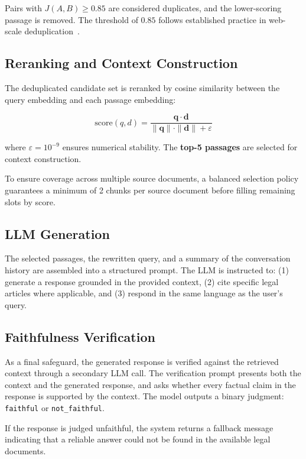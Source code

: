 \documentclass[12pt, a4paper]{article}
\begin{document}
Pairs with $J(A,B) \geq 0.85$ are considered duplicates, and the lower-scoring
passage is removed. The threshold of $0.85$ follows established practice in
web-scale deduplication~\cite{manku2007neardup}.

\subsection{Reranking and Context Construction}

The deduplicated candidate set is reranked by cosine similarity between the query
embedding and each passage embedding:

\begin{equation}
  \mathrm{score}(q, d) = \frac{\mathbf{q} \cdot \mathbf{d}}
                              {\|\mathbf{q}\| \cdot \|\mathbf{d}\| + \varepsilon}
  \label{eq:cosine}
\end{equation}

where $\varepsilon = 10^{-9}$ ensures numerical stability. The \textbf{top-5
passages} are selected for context construction.

To ensure coverage across multiple source documents, a balanced selection policy
guarantees a minimum of 2 chunks per source document before filling remaining
slots by score.

\subsection{LLM Generation}

The selected passages, the rewritten query, and a summary of the conversation
history are assembled into a structured prompt. The LLM is instructed to:
(1) generate a response grounded in the provided context,
(2) cite specific legal articles where applicable, and
(3) respond in the same language as the user's query.

\subsection{Faithfulness Verification}

As a final safeguard, the generated response is verified against the retrieved
context through a secondary LLM call. The verification prompt presents both the
context and the generated response, and asks whether every factual claim in the
response is supported by the context. The model outputs a binary judgment:
\texttt{faithful} or \texttt{not\_faithful}.

If the response is judged unfaithful, the system returns a fallback message
indicating that a reliable answer could not be found in the available legal
documents.
\end{document}

